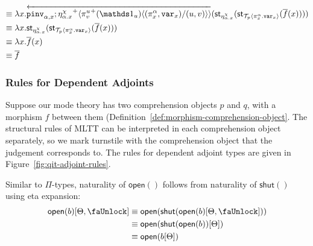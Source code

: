 \documentclass[10pt]{article}
\theoremstyle{definition}
\newcommand{\rewrite}[2]{\overleftarrow{#1}(#2)}
\newcommand\UI[2]{\ensuremath{\lambda #1.#2}}
\newcommand\StI[2]{\ensuremath{\mathsf{st}_{#1}(#2)}}
\newcommand\TrPlus[2]{\ensuremath{{#1}^+(#2)}}
\newcommand\ApEl[2]{\mathcal{T}_{#1}\langle#2\rangle}
\newcommand\bdot[0]{\mathbin{.}}
\newcommand\ap[2]{\ensuremath{#1 \langle #2 \rangle }}
\newcommand\ApPlus[2]{\ensuremath{{#1}^+ \langle #2 \rangle }}
\begin{document}
\begin{enumerate}[style = multiline, labelwidth = 80pt]
\begin{align*}
\equiv{} &\UI{x}{\rewrite{\pinv{\alpha,x};\ApPlus{\eta^\chi_{\alpha.x}}{\ap{\TrPlus{\pi^u_v}{\One_u}}{(\pi^\alpha_x,\var{x})/(u,v)}}}{\StI{\eta^\chi_{\alpha.x}}{\StI{\ApEl{p}{\pi^\alpha_x \bdot \var{x}}}{\upstairs{f}(x)}}}} \\
\equiv{} &\UI{x}{\StI{\eta^\chi_{\alpha.x}}{\StI{\ApEl{p}{\pi^\alpha_x \bdot \var{x}}}{\upstairs{f}(x)}}} \\
\equiv{} &\UI{x}{\upstairs{f}(x)} \\
\equiv{} &\upstairs{f}
\end{align*}
\end{enumerate}

\subsubsection{Rules for Dependent Adjoints}
\newcommand{\lock}{\mbox{\faUnlock}}
\newcommand{\Rtype}[1]{\mathsf{R}{#1}}
\newcommand{\RI}[1]{\mathsf{shut}({#1})}
\newcommand{\RE}[1]{\mathsf{open}({#1})}

\newcommand{\Ltype}[1]{\mathsf{L}{#1}}
\newcommand{\LI}[1]{\mathsf{left}_{#1}}
\newcommand{\LE}[1]{\mathsf{spleft}({#1})}

Suppose our mode theory has two comprehension objects $p$ and $q$, with a morphism $f$ between them (Definition~\ref{def:morphism-comprehension-object}. The structural rules of MLTT can be interpreted in each comprehension object separately, so we mark turnstile with the comprehension object that the judgement corresponds to. The rules for dependent adjoint types are given in Figure~\ref{fig:qit-adjoint-rules}.

Similar to $\Pi$-types, naturality of $\RE{}$ follows from naturality of $\RI{}$ using eta expansion:
\begin{align*}
\RE{b}[\Theta, \lock] 
&\equiv \RE{\RI{\RE{b}[\Theta, \lock]}} \\
&\equiv \RE{\RI{\RE{b}}[\Theta]} \\
&\equiv \RE{b[\Theta]}
\end{align*}
\end{document}
